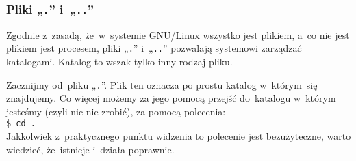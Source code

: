 \documentclass[10pt,t]{beamer}
\begin{document}
\begin{frame}
  \frametitle{Pliki „\texttt{.}” i~„\texttt{..}”}


  Zgodnie z~zasadą, że~w~systemie GNU/Linux wszystko jest plikiem, a~co nie
  jest plikiem jest procesem, pliki „\texttt{.}” i~„\texttt{..}” pozwalają
  systemowi zarządzać katalogami. Katalog to wszak tylko inny rodzaj pliku.

  Zacznijmy od~pliku „\texttt{.}”. Plik ten oznacza po prostu katalog
  w~którym~się znajdujemy. Co więcej możemy za jego pomocą przejść
  do~katalogu w~którym jesteśmy (czyli nic nie zrobić), za pomocą
  polecenia: \\
  \texttt{\$ cd .} \\
  Jakkolwiek z~praktycznego punktu widzenia to polecenie jest bezużyteczne,
  warto wiedzieć, że~istnieje i~działa poprawnie.

\end{frame}






































\end{document}
